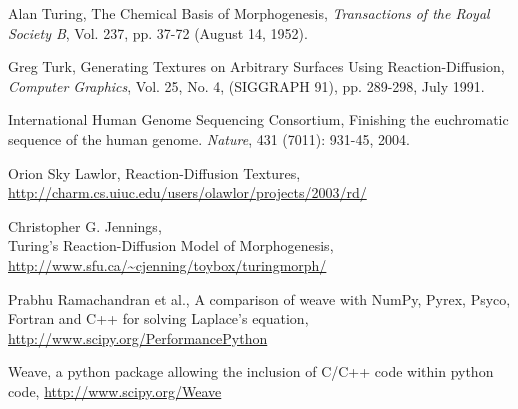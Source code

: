 \documentclass[a4paper,11pt]{article}
\begin{document}
\begin{thebibliography}{99} %

  Alan Turing,
  The Chemical Basis of Morphogenesis,
  \emph{Transactions of the Royal Society B}, Vol. 237, pp. 37-72 (August 14, 1952).

  Greg Turk,
  Generating Textures on Arbitrary Surfaces Using Reaction-Diffusion,
  \emph{Computer Graphics}, Vol. 25, No. 4, (SIGGRAPH 91), pp. 289-298, July 1991.

  International Human Genome Sequencing Consortium,
  Finishing the euchromatic sequence of the human genome.
  \emph{Nature}, 431 (7011): 931-45, 2004.

  Orion Sky Lawlor,
  Reaction-Diffusion Textures, \\
  \url{http://charm.cs.uiuc.edu/users/olawlor/projects/2003/rd/}

  Christopher G. Jennings, \\
  Turing's Reaction-Diffusion Model of Morphogenesis, \\
  \url{http://www.sfu.ca/~cjenning/toybox/turingmorph/}

	Prabhu Ramachandran et al.,
  A comparison of weave with NumPy, Pyrex, Psyco, Fortran and C++ for solving Laplace's equation, \\
	\url{http://www.scipy.org/PerformancePython}

	Weave, a python package allowing the inclusion of C/C++ code within python code,
	\url{http://www.scipy.org/Weave}

\end{thebibliography}%
\end{document}
